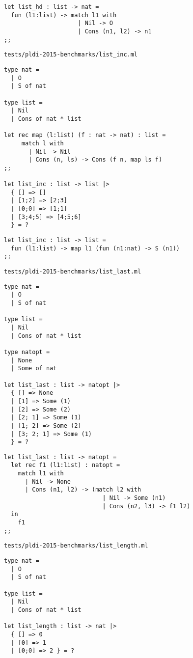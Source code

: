 \begin{verbatim}
let list_hd : list -> nat =
  fun (l1:list) -> match l1 with
                     | Nil -> O
                     | Cons (n1, l2) -> n1
;;
\end{verbatim}

\noindent\large\texttt{tests/pldi-2015-benchmarks/list\_inc.ml}
\begin{verbatim}
type nat =
  | O
  | S of nat

type list =
  | Nil
  | Cons of nat * list

let rec map (l:list) (f : nat -> nat) : list =
     match l with
       | Nil -> Nil
       | Cons (n, ls) -> Cons (f n, map ls f)
;;

let list_inc : list -> list |>
  { [] => []
  | [1;2] => [2;3]
  | [0;0] => [1;1]
  | [3;4;5] => [4;5;6]
  } = ?
\end{verbatim}

\begin{verbatim}
let list_inc : list -> list =
  fun (l1:list) -> map l1 (fun (n1:nat) -> S (n1))
;;
\end{verbatim}

\noindent\large\texttt{tests/pldi-2015-benchmarks/list\_last.ml}
\begin{verbatim}
type nat =
  | O
  | S of nat

type list =
  | Nil
  | Cons of nat * list

type natopt =
  | None
  | Some of nat

let list_last : list -> natopt |>
  { [] => None
  | [1] => Some (1)
  | [2] => Some (2)
  | [2; 1] => Some (1)
  | [1; 2] => Some (2)
  | [3; 2; 1] => Some (1)
  } = ?
\end{verbatim}

\begin{verbatim}
let list_last : list -> natopt =
  let rec f1 (l1:list) : natopt =
    match l1 with
      | Nil -> None
      | Cons (n1, l2) -> (match l2 with
                            | Nil -> Some (n1)
                            | Cons (n2, l3) -> f1 l2)
  in
    f1
;;
\end{verbatim}

\noindent\large\texttt{tests/pldi-2015-benchmarks/list\_length.ml}
\begin{verbatim}
type nat =
  | O
  | S of nat

type list =
  | Nil
  | Cons of nat * list

let list_length : list -> nat |>
  { [] => 0
  | [0] => 1
  | [0;0] => 2 } = ?
\end{verbatim}

